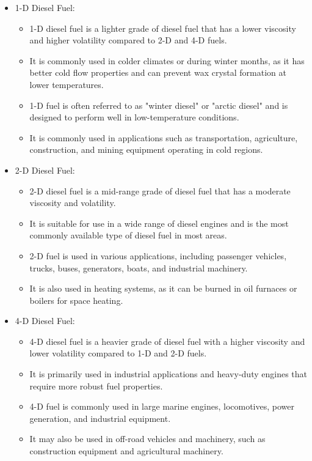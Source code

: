 \documentclass{article}
\begin{document}
\begin{itemize}
  \item 1-D Diesel Fuel:
    \begin{itemize}
      \item 1-D diesel fuel is a lighter grade of diesel fuel that has a lower viscosity and higher volatility compared to 2-D and 4-D fuels.
      \item It is commonly used in colder climates or during winter months, as it has better cold flow properties and can prevent wax crystal formation at lower temperatures.
      \item 1-D fuel is often referred to as "winter diesel" or "arctic diesel" and is designed to perform well in low-temperature conditions.
      \item It is commonly used in applications such as transportation, agriculture, construction, and mining equipment operating in cold regions.
    \end{itemize}
  \item 2-D Diesel Fuel:
      \begin{itemize}
        \item 2-D diesel fuel is a mid-range grade of diesel fuel that has a moderate viscosity and volatility.
        \item It is suitable for use in a wide range of diesel engines and is the most commonly available type of diesel fuel in most areas.
        \item 2-D fuel is used in various applications, including passenger vehicles, trucks, buses, generators, boats, and industrial machinery.
        \item It is also used in heating systems, as it can be burned in oil furnaces or boilers for space heating.
      \end{itemize}

  \item 4-D Diesel Fuel:
      \begin{itemize}
        \item 4-D diesel fuel is a heavier grade of diesel fuel with a higher viscosity and lower volatility compared to 1-D and 2-D fuels.
        \item It is primarily used in industrial applications and heavy-duty engines that require more robust fuel properties.
        \item 4-D fuel is commonly used in large marine engines, locomotives, power generation, and industrial equipment.
        \item It may also be used in off-road vehicles and machinery, such as construction equipment and agricultural machinery.
      \end{itemize}

\end{itemize}
\end{document}
